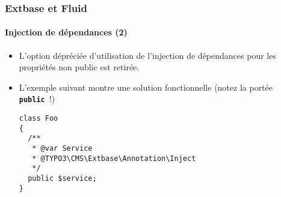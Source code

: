 %

\begin{frame}[fragile]
	\frametitle{Extbase et Fluid}
	\framesubtitle{Injection de dépendances (2)}


	\begin{itemize}
		\item L'option dépréciée d'utilisation de l'injection de dépendances
			pour les propriétés non public est retirée.
		\item L'exemple suivant montre une solution fonctionnelle\newline
			\small(notez la portée \texttt{\textbf{public}}~!)\normalsize
\begin{lstlisting}
class Foo
{
  /**
   * @var Service
   * @TYPO3\CMS\Extbase\Annotation\Inject
   */
  public $service;
}
\end{lstlisting}

	\end{itemize}

\end{frame}

